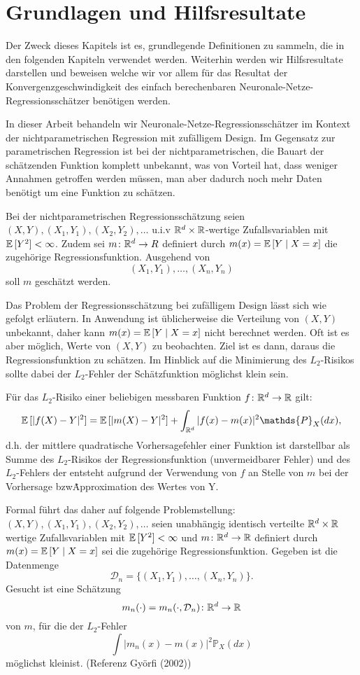 \chapter{Grundlagen und Hilfsresultate}
\label{chap:1}

Der Zweck dieses Kapitels ist es, grundlegende Definitionen zu sammeln, die in den folgenden Kapiteln verwendet werden. Weiterhin werden wir Hilfsresultate darstellen und beweisen welche wir vor allem für das Resultat der Konvergenzgeschwindigkeit des einfach berechenbaren Neuronale-Netze-Regressionsschätzer benötigen werden.

In dieser Arbeit behandeln wir Neuronale-Netze-Regressionsschätzer im Kontext der nichtparametrischen Regression mit zufälligem Design. Im Gegensatz zur parametrischen Regression ist bei der nichtparametrischen, die Bauart der schätzenden Funktion komplett unbekannt, was von Vorteil hat, dass weniger Annahmen getroffen werden müssen, man aber dadurch noch mehr Daten benötigt um eine Funktion zu schätzen.

Bei der nichtparametrischen Regressionsschätzung seien $(X, Y), (X_1, Y_1), (X_2, Y_2), \dots$ u.i.v $\mathbb{R}^d \times \mathbb{R}$-wertige Zufallsvariablen mit $\mathbb{E}\,[Y^2] < \infty$. Zudem sei $m\colon \mathbb{R}^d \to R$ definiert durch $m(x) = \mathbb{E}\,[Y \mid X = x]$ die zugehörige Regressionsfunktion. Ausgehend von 
$$ (X_1, Y_1),\dots,(X_n, Y_n)$$ 
soll $m$ geschätzt werden.

Das Problem der Regressionsschätzung bei zufälligem Design lässt sich wie gefolgt erläutern. In Anwendung ist üblicherweise die Verteilung von $(X, Y)$ unbekannt, daher kann $m(x) = \mathbb{E}\,[Y \mid X = x]$ nicht berechnet werden. Oft ist es aber möglich, Werte von $(X, Y)$ zu beobachten. Ziel ist es dann, daraus die Regressionsfunktion zu schätzen. Im Hinblick auf die Minimierung des $L_2$-Risikos sollte dabei der $L_2$-Fehler der Schätzfunktion möglichst klein sein. 

Für das $L_2$-Risiko einer beliebigen messbaren Funktion $f\colon \mathbb{R}^d \to \mathbb{R}$  gilt$\colon$
$$\E[|f(X) - Y|^2] = \E[|m(X) - Y|^2] + \int_{\R^d}|f(x) - m(x)|^2 \mathds{P}_X (dx),$$
d.h. der mittlere quadratische Vorhersagefehler einer Funktion ist darstellbar als Summe des $L_2$-Risikos der Regressionsfunktion (unvermeidbarer Fehler) und des $L_2$-Fehlers der entsteht aufgrund der Verwendung von $f$ an Stelle von $m$ bei der Vorhersage bzw\. Approximation des Wertes von Y.

Formal führt das daher auf folgende Problemstellung$\colon$
$(X, Y), (X_1, Y_1), (X_2, Y_2), \dots$ seien unabhängig identisch verteilte $\mathbb{R}^d \times \mathbb{R}$ wertige Zufallsvariablen mit $\mathbb{E}\,[Y^2] < \infty$ und $m\colon\mathbb{R}^d \to \mathbb{R}$ definiert durch $m(x) = \mathbb{E}\,[Y \mid X = x]$ sei die zugehörige Regressionsfunktion. Gegeben ist die Datenmenge 
$$ \mathcal{D}_n = \{(X_1, Y_1),\dots,(X_n, Y_n)\}.$$
Gesucht ist eine Schätzung 
$$m_n(\cdot) = m_n(\cdot, \mathcal{D}_n)\colon\mathbb{R}^d \to \mathbb{R} $$
von $m$, für die der $L_2$-Fehler 
$$\int |m_n(x) - m(x)|^2 \mathds{P}_X(dx)$$
möglichst \glqq klein\grqq ist. (Referenz Györfi (2002))

